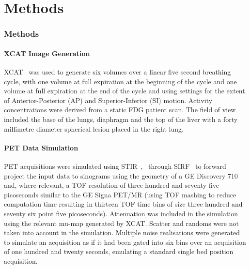 \chapter{Methods} \label{methods}
    \blindtext
    
        \blindtext
        
        \subsection{Methods} \label{impact_of_tof_on_respiratory_motion_modelling_using_nac_pet_methods}
            \subsubsection{XCAT Image Generation} \label{impact_of_tof_on_respiratory_motion_modelling_using_nac_pet_methods_xcat_image_generation}
                \gls{XCAT}~ was used to generate six volumes over a linear five second breathing cycle, with one volume at full expiration at the beginning of the cycle and one volume at full expiration at the end of the cycle and using settings for the extent of Anterior-Posterior (AP) and Superior-Inferior (SI) motion. Activity concentrations were derived from a static \gls{FDG} patient scan. The field of view included the base of the lungs, diaphragm and the top of the liver with a forty millimetre diameter spherical lesion placed in the right lung.
            
            \subsubsection{PET Data Simulation} \label{impact_of_tof_on_respiratory_motion_modelling_using_nac_pet_methods_pet_data_simulation}
                \gls{PET} acquisitions were simulated using \gls{STIR}~,~ through \gls{SIRF}~ to forward project the input data to sinograms using the geometry of a GE Discovery 710 and, where relevant, a \gls{TOF} resolution of three hundred and seventy five picoseconds similar to the GE Signa \gls{PET}/\gls{MR} (using \gls{TOF} mashing to reduce computation time resulting in thirteen \gls{TOF} time bins of size three hundred and seventy six point five picoseconds). Attenuation was included in the simulation using the relevant \gls{mu-map} generated by \gls{XCAT}. Scatter and randoms were not taken into account in the simulation. Multiple noise realisations were generated to simulate an acquisition as if it had been gated into six bins over an acquisition of one hundred and twenty seconds, emulating a standard single bed position acquisition. 
            
